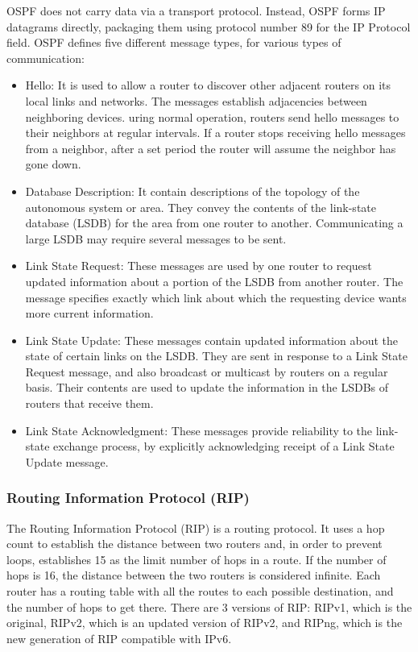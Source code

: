 OSPF does not carry data via a transport protocol. Instead, OSPF forms IP datagrams directly, packaging them using protocol number 89 for the IP Protocol field. OSPF defines five different message types, for various types of communication:

\begin{itemize}
\item Hello: It is used to allow a router to discover other adjacent routers on its local links and networks. The messages establish adjacencies between neighboring devices. uring normal operation, routers send hello messages to their neighbors at regular intervals. If a router stops receiving hello messages from a neighbor, after a set period the router will assume the neighbor has gone down.
\item Database Description: It contain descriptions of the topology of the autonomous system or area.  They convey the contents of the link-state database (LSDB) for the area from one router to another. Communicating a large LSDB may require several messages to be sent.
\item Link State Request: These messages are used by one router to request updated information about a portion of the LSDB from another router. The message specifies exactly which link about which the requesting device wants more current information.
\item Link State Update: These messages contain updated information about the state of certain links on the LSDB. They are sent in response to a Link State Request message, and also broadcast or multicast by routers on a regular basis. Their contents are used to update the information in the LSDBs of routers that receive them.
\item Link State Acknowledgment: These messages provide reliability to the link-state exchange process, by explicitly acknowledging receipt of a Link State Update message.
\end{itemize}

\subsubsection*{Routing Information Protocol (RIP)\cite{RIPv2}\cite{RIPng}}
The Routing Information Protocol (RIP) is a routing protocol. It uses a hop count to establish the distance between two routers and, in order to prevent loops, establishes 15 as the limit number of hops in a route. If the number of hops is 16, the distance between the two routers is considered infinite. Each router has a routing table with all the routes to each possible destination, and the number of hops to get there. There are 3 versions of RIP: RIPv1, which is the original, RIPv2, which is an updated version of RIPv2, and RIPng, which is the new generation of RIP compatible with IPv6.

